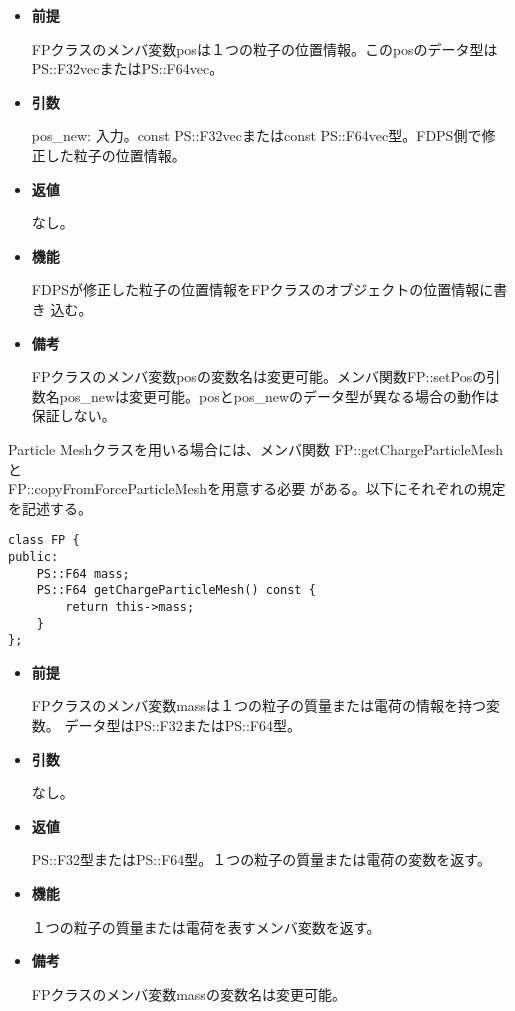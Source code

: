 \begin{itemize}

\item {\bf 前提}

  FPクラスのメンバ変数posは１つの粒子の位置情報。このposのデータ型は
  PS::F32vecまたはPS::F64vec。

\item {\bf 引数}

  pos\_new: 入力。const PS::F32vecまたはconst PS::F64vec型。FDPS側で修
  正した粒子の位置情報。

\item {\bf 返値}

  なし。
  
\item {\bf 機能}

  FDPSが修正した粒子の位置情報をFPクラスのオブジェクトの位置情報に書き
  込む。

\item {\bf 備考}

  FPクラスのメンバ変数posの変数名は変更可能。メンバ関数FP::setPosの引
  数名pos\_newは変更可能。posとpos\_newのデータ型が異なる場合の動作は
  保証しない。

\end{itemize}


Particle Meshクラスを用いる場合には、メンバ関数
FP::getChargeParticleMeshと\\FP::copyFromForceParticleMeshを用意する必要
がある。以下にそれぞれの規定を記述する。


\begin{screen}
\begin{verbatim}
class FP {
public:
    PS::F64 mass;
    PS::F64 getChargeParticleMesh() const {
        return this->mass;
    }
};
\end{verbatim}
\end{screen}

\begin{itemize}

\item {\bf 前提}

  FPクラスのメンバ変数massは１つの粒子の質量または電荷の情報を持つ変数。
  データ型はPS::F32またはPS::F64型。

\item {\bf 引数}

  なし。

\item {\bf 返値}

  PS::F32型またはPS::F64型。１つの粒子の質量または電荷の変数を返す。
  
\item {\bf 機能}

  １つの粒子の質量または電荷を表すメンバ変数を返す。

\item {\bf 備考}

  FPクラスのメンバ変数massの変数名は変更可能。

\end{itemize}


